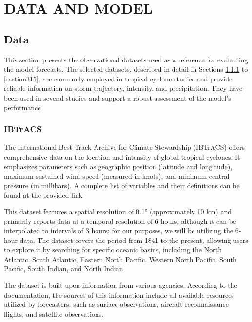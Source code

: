 \chapter{DATA AND MODEL}
\label{ch:data}

\section{Data}

This section presents the observational datasets used as a reference for evaluating the model forecasts. The selected datasets, described in detail in Sections \ref{section311} to \ref{section315}, are commonly employed in tropical cyclone studies and provide reliable information on storm trajectory, intensity, and precipitation. They have been used in several studies \cite{zhou2021regionalization, bopape2021sensitivity, dulac2024assessing, yang2024evaluation, may2024cnn} and support a robust assessment of the model's performance

\subsection{IBTrACS}
\label{section311}

The International Best Track Archive for Climate Stewardship (IBTrACS) \cite{knapp2010international} offers comprehensive data on the location and intensity of global tropical cyclones. It emphasizes parameters such as geographic position (latitude and longitude), maximum sustained wind speed (measured in knots), and minimum central pressure (in millibars). A complete list of variables and their definitions can be found at the provided link %

This dataset features a spatial resolution of 0.1° (approximately 10 km) and primarily reports data at a temporal resolution of 6 hours, although it can be interpolated to intervals of 3 hours; for our purposes, we will be utilizing the 6-hour data. The dataset covers the period from 1841 to the present, allowing users to explore it by searching for specific oceanic basins, including the North Atlantic, South Atlantic, Eastern North Pacific, Western North Pacific, South Pacific, South Indian, and North Indian.

The dataset is built upon information from various agencies. According to the documentation, the sources of this information include all available resources utilized by forecasters, such as surface observations, aircraft reconnaissance flights, and satellite observations.

